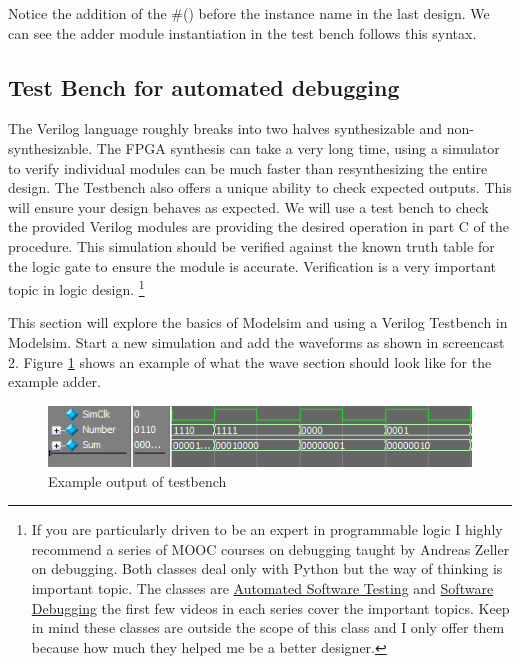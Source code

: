       Notice the addition of the \#() before the instance name in the last design. We can see the adder module instantiation in the test bench follows this syntax.
      

    \subsection{Test Bench for automated debugging}
      The Verilog language roughly breaks into two halves synthesizable and non-synthesizable. The FPGA synthesis can take a very long time, using a simulator to verify individual modules can be much faster than resynthesizing the entire design. The Testbench also offers a unique ability to check expected outputs. This will ensure your design behaves as expected. We will use a test bench to check the provided Verilog modules are providing the desired operation in part C of the procedure. This simulation should be verified against the known truth table for the logic gate to ensure the module is accurate. Verification is a very important topic in logic design. \footnote{If you are particularly driven to be an expert in programmable logic I highly recommend a series of MOOC courses on debugging taught by Andreas Zeller on debugging. Both classes deal only with Python but the way of thinking is important topic. The classes are \href{https://www.udacity.com/course/cs258}{Automated Software Testing} and \href{https://www.udacity.com/course/cs259}{Software Debugging} the first few videos in each series cover the important topics. Keep in mind these classes are outside the scope of this class and I only offer them because how much they helped me be a better designer.}

      

      This section will explore the basics of Modelsim and using a Verilog Testbench in Modelsim. Start a new simulation and add the waveforms as shown in screencast 2. Figure \ref{LogicOut} shows an example of what the wave section should look like for the example adder. 
      \begin{figure}[H]
        \includegraphics[width=.48\textwidth]{Images/LogicOutput.png}
        \caption{Example output of testbench}
        \label{LogicOut}
      \end{figure}


